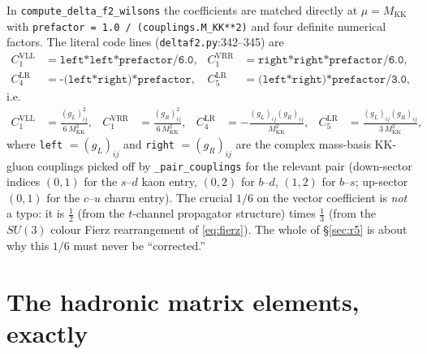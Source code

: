 \documentclass[11pt]{article}
\newcommand{\MKK}{M_{\mathrm{KK}}}
\newcommand{\half}{\tfrac{1}{2}}
\newcommand{\CVLL}{C_1^{\mathrm{VLL}}}
\newcommand{\CVRR}{C_1^{\mathrm{VRR}}}
\newcommand{\CLRfour}{C_4^{\mathrm{LR}}}
\newcommand{\CLRfive}{C_5^{\mathrm{LR}}}
\newcommand{\code}[1]{\texttt{#1}}
\theoremstyle{definition}
\begin{document}
In \code{compute\_delta\_f2\_wilsons} the coefficients are matched directly at
$\mu=\MKK$ with \code{prefactor = 1.0 / (couplings.M\_KK**2)} and four definite
numerical factors. The literal code lines (\code{deltaf2.py}:342--345) are
\begin{align}
\CVLL &= \texttt{left*left*prefactor/6.0}, &
\CVRR &= \texttt{right*right*prefactor/6.0},
\label{eq:codeC1}\\
\CLRfour &= \texttt{-(left*right)*prefactor}, &
\CLRfive &= \texttt{(left*right)*prefactor/3.0},
\label{eq:codeC45}
\end{align}
i.e.
\begin{align}
\CVLL &= \frac{(g_L)_{ij}^2}{6\,\MKK^2}, &
\CVRR &= \frac{(g_R)_{ij}^2}{6\,\MKK^2}, &
\CLRfour &= -\frac{(g_L)_{ij}(g_R)_{ij}}{\MKK^2}, &
\CLRfive &= \frac{(g_L)_{ij}(g_R)_{ij}}{3\,\MKK^2},
\label{eq:codeWilson}
\end{align}
where \code{left} $=(g_L)_{ij}$ and \code{right} $=(g_R)_{ij}$ are the complex
mass-basis KK-gluon couplings picked off by \code{\_pair\_couplings} for the
relevant pair (down-sector indices $(0,1)$ for the $s$--$d$ kaon entry, $(0,2)$
for $b$--$d$, $(1,2)$ for $b$--$s$; up-sector $(0,1)$ for the $c$--$u$ charm
entry). The crucial $1/6$ on the vector coefficient is \emph{not} a typo: it is
$\half$ (from the $t$-channel propagator structure) times $\tfrac13$ (from the
$SU(3)$ colour Fierz rearrangement of \eqref{eq:fierz}). The whole of
\S\ref{sec:r5} is about why this $1/6$ must never be ``corrected.''

\section{The hadronic matrix elements, exactly}
\label{sec:codeME}
\end{document}
